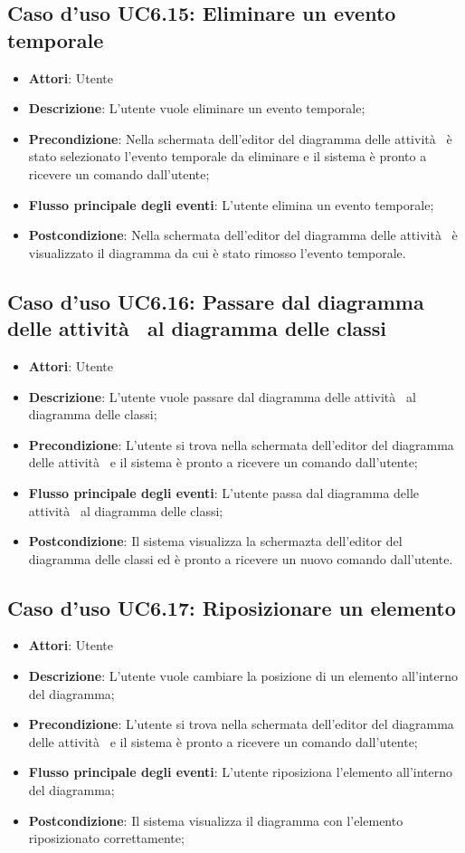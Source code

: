 \documentclass[../AnalisiDeiRequisiti.tex]{subfiles}
\begin{document}
				\subsection{Caso d'uso UC6.15: Eliminare un evento temporale}
				\begin{itemize}
					\item \textbf{Attori}: Utente
					\item \textbf{Descrizione}: L'utente vuole eliminare un evento temporale;
					\item \textbf{Precondizione}: Nella schermata dell'editor del diagramma delle attività  è stato selezionato l'evento temporale da eliminare e il sistema è pronto a ricevere un comando dall'utente;
					\item \textbf{Flusso principale degli eventi}: L'utente elimina un evento temporale;
					\item \textbf{Postcondizione}: Nella schermata dell'editor del diagramma delle attività  è visualizzato il diagramma da cui è stato rimosso l'evento temporale.
				\end{itemize}
				\subsection{Caso d'uso UC6.16: Passare dal diagramma delle attività  al diagramma delle classi}
				\begin{itemize}
					\item \textbf{Attori}: Utente
					\item \textbf{Descrizione}: L'utente vuole passare dal diagramma delle attività  al diagramma delle classi;
					\item \textbf{Precondizione}: L'utente si trova nella schermata dell'editor del diagramma delle attività  e il sistema è pronto a ricevere un comando dall'utente;
					\item \textbf{Flusso principale degli eventi}: L'utente passa dal diagramma delle attività  al diagramma delle classi;
					\item \textbf{Postcondizione}: Il sistema visualizza la schermazta dell'editor del diagramma delle classi ed è pronto a ricevere un nuovo comando dall'utente.
				\end{itemize}
				\subsection{Caso d'uso UC6.17: Riposizionare un elemento}
				\begin{itemize}
					\item \textbf{Attori}: Utente
					\item \textbf{Descrizione}: L'utente vuole cambiare la posizione di un elemento all'interno del diagramma;
					\item \textbf{Precondizione}: L'utente si trova nella schermata dell'editor del diagramma delle attività  e il sistema è pronto a ricevere un comando dall'utente;
					\item \textbf{Flusso principale degli eventi}: L'utente riposiziona l'elemento all'interno del diagramma;
					\item \textbf{Postcondizione}: Il sistema visualizza il diagramma con l'elemento riposizionato correttamente;
				\end{itemize}
\end{document}
